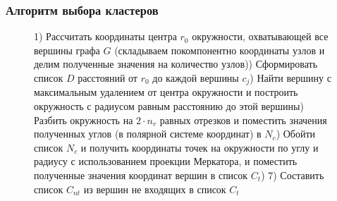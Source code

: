 \begin{frame}
    \frametitle{Алгоритм выбора кластеров}
    \begin{figure}[ht!]
        \scriptsize
        \begin{algorithm}[H]
            1) Рассчитать координаты центра \( r_0 \) окружности, охватывающей все вершины графа \( G \) 
                (складываем покомпонентно координаты узлов и делим полученные значения на количество узлов)) Сформировать список \( D \) расстояний от \( r_0 \) до каждой вершины \( c_j \)) Найти вершину с максимальным удалением от центра окружности и построить окружность с радиусом 
                равным расстоянию до этой вершины) Разбить окружность на \( 2\cdot n_r \) равных отрезков и поместить значения полученных 
                углов (в полярной системе координат) в \( N_c \)) Обойти список \( N_c \) и получить координаты точек на окружности по углу и радиусу с 
                использованием проекции Меркатора, и поместить полученные значения координат вершин в 
                список \( C_t \)) 
            7) Составить список \( C_{nt} \) из вершин не входящих в список \( C_t \)\;
        \end{algorithm}
    \end{figure}
\end{frame}

